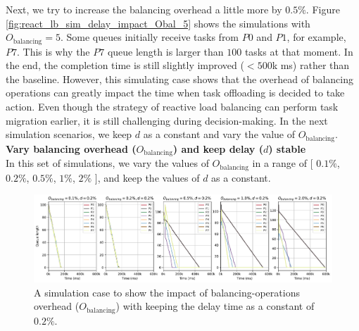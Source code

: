 Next, we try to increase the balancing overhead a little more by $0.5\%$. Figure \ref{fig:react_lb_sim_delay_impact_Obal_5} shows the simulations with $O_{\text{balancing}}=5$. Some queues initially receive tasks from $P0$ and $P1$, for example, $P7$. This is why the $P7$ queue length is larger than $100$ tasks at that moment. In the end, the completion time is still slightly improved ($< 500$k ms) rather than the baseline. However, this simulating case shows that the overhead of balancing operations can greatly impact the time when task offloading is decided to take action. Even though the strategy of reactive load balancing can perform task migration earlier, it is still challenging during decision-making. In the next simulation scenarios, we keep $d$ as a constant and vary the value of $O_{\text{balancing}}$.\\

\noindent \textbf{Vary balancing overhead ($O_{\text{balancing}}$) and keep delay ($d$) stable}\\
\noindent In this set of simulations, we vary the values of $O_{\text{balancing}}$ in a range of $[$ $0.1\%$, $0.2\%$, $0.5\%$, $1\%$, $2\%$ $]$, and keep the values of $d$ as a constant.\\

\begin{figure}[t]
  \centering
  \includegraphics[scale=0.45]{./pictures/perf_analysis_model/perf_model_queue_decrease_blancing_impact_d2.pdf}
	\caption{A simulation case to show the impact of balancing-operations overhead ($O_{\text{balancing}}$) with keeping the delay time as a constant of $0.2\%$.}
	\label{fig:react_lb_sim_Obalancing_impact_d_2}
\end{figure}

